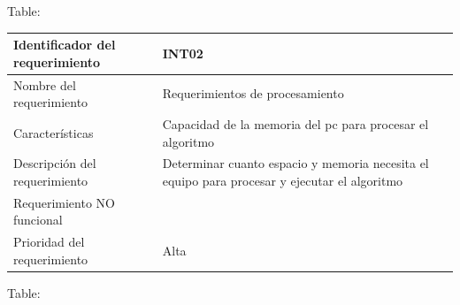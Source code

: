 \documentclass[]{article}
\begin{document}
Table:

\begin{longtable}[]{@{}ll@{}}
\toprule
\begin{minipage}[b]{0.39\columnwidth}\raggedright\strut
Identificador del requerimiento\strut
\end{minipage} & \begin{minipage}[b]{0.50\columnwidth}\raggedright\strut
INT02\strut
\end{minipage}\tabularnewline
\midrule
\endhead
\begin{minipage}[t]{0.39\columnwidth}\raggedright\strut
Nombre del requerimiento\strut
\end{minipage} & \begin{minipage}[t]{0.50\columnwidth}\raggedright\strut
Requerimientos de procesamiento\strut
\end{minipage}\tabularnewline
\begin{minipage}[t]{0.39\columnwidth}\raggedright\strut
Características\strut
\end{minipage} & \begin{minipage}[t]{0.50\columnwidth}\raggedright\strut
Capacidad de la memoria del pc para procesar el algoritmo\strut
\end{minipage}\tabularnewline
\begin{minipage}[t]{0.39\columnwidth}\raggedright\strut
Descripción del requerimiento\strut
\end{minipage} & \begin{minipage}[t]{0.50\columnwidth}\raggedright\strut
Determinar cuanto espacio y memoria necesita el equipo para procesar y
ejecutar el algoritmo\strut
\end{minipage}\tabularnewline
\begin{minipage}[t]{0.39\columnwidth}\raggedright\strut
Requerimiento NO funcional\strut
\end{minipage} & \begin{minipage}[t]{0.50\columnwidth}\raggedright\strut
\strut
\end{minipage}\tabularnewline
\begin{minipage}[t]{0.39\columnwidth}\raggedright\strut
Prioridad del requerimiento\strut
\end{minipage} & \begin{minipage}[t]{0.50\columnwidth}\raggedright\strut
Alta\strut
\end{minipage}\tabularnewline
\bottomrule
\end{longtable}

Table:
\end{document}
